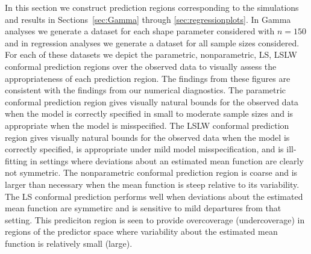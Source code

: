 \documentclass[11pt]{article}\usepackage[]{graphicx}\usepackage[]{color}
\begin{document}
In this section we construct prediction regions corresponding to the 
simulations and results in Sections~\ref{sec:Gamma} through 
\ref{sec:regressionplots}.  In Gamma analyses we generate a dataset for each 
shape parameter considered with $n = 150$ and in regression analyses we 
generate a dataset for all sample sizes considered.  For each of these datasets 
we depict the parametric, nonparametric, LS, LSLW conformal prediction regions 
over the observed data to visually assess the appropriateness of each 
prediction region.  The findings from these figures are consistent with the 
findings from our numerical diagnostics.  
The parametric conformal prediction region gives visually natural bounds for 
the observed data when the model is correctly specified in small to moderate 
sample sizes and is appropriate when the model is misspecified. 
The LSLW conformal prediction region gives visually natural bounds for the 
observed data when the model is correctly specified, is appropriate under mild 
model misspecification, and is ill-fitting in settings where deviations about 
an estimated mean function are clearly not symmetric.
The nonparametric conformal prediction region is coarse and is larger than 
necessary when the mean function is steep relative to its variability.  
The LS conformal prediction performs well when deviations about the estimated 
mean function are symmetirc and is sensitive to mild departures from that 
setting.  This prediciton region is seen to provide overcoverage 
(undercoverage) in regions of the predictor space where variability about the 
estimated mean function is relatively small (large).
\end{document}
